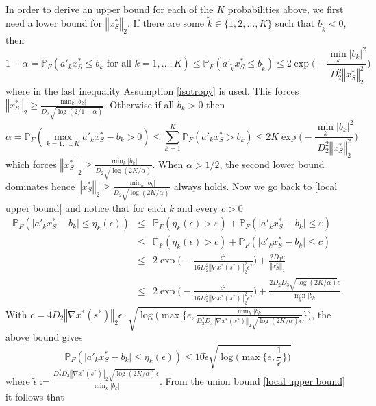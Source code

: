 \documentclass[mnsc,blindrev]{informs4} %
\newcommand{\norm}[1]{\left \Vert #1 \right\Vert}
\begin{document}
In order to derive an upper bound for each of the $K$ probabilities above, we first need a lower bound for $\norm{x^*_S}_2$. If there are some $\tilde k\in\{1,2,\ldots,K\}$ such that $b_{\tilde k}<0$, then
\begin{equation*}
    1-\alpha = \mathbb P_F(a'_kx^*_S\leq b_k\text{ for all }k=1,\ldots,K)\leq\mathbb P_F(a'_{\tilde k}x^*_S\leq b_{\tilde k})\leq 2\exp\big(-\frac{\min_k\lvert b_k\rvert^2}{D_2^2\norm{x^*_S}_2^2}\big)
\end{equation*}
where in the last inequality Assumption \ref{isotropy} is used. This forces $\norm{x^*_S}_2\geq \frac{\min_k\lvert b_k\rvert}{D_2\sqrt{\log(2/1-\alpha)}}$.
Otherwise if all $b_k>0$ then
\begin{equation*}
    \alpha = \mathbb P_F(\max_{k=1,\ldots,K}a'_kx^*_S- b_k>0)\leq \sum_{k=1}^K\mathbb P_F(a'_kx^*_S>b_k)\leq 2K\exp\big(-\frac{\min_k\lvert b_k\rvert^2}{D_2^2\norm{x^*_S}_2^2}\big)
\end{equation*}
which forces $\norm{x^*_S}_2\geq \frac{\min_k\lvert b_k\rvert}{D_2\sqrt{\log(2K/\alpha)}}$. When $\alpha >1/2$, the second lower bound dominates hence $\norm{x^*_S}_2\geq \frac{\min_k\lvert b_k\rvert}{D_2\sqrt{\log(2K/\alpha)}}$ always holds. Now we go back to \eqref{local upper bound} and notice that for each $k$ and every $c>0$
\begin{eqnarray*}
\mathbb P_F(\lvert a'_kx^*_S- b_k\rvert\leq \eta_k(\epsilon))&\leq&\mathbb P_F(\eta_k(\epsilon)>\varepsilon)+\mathbb P_F(\lvert a'_kx^*_S- b_k\rvert\leq \varepsilon)\\
&\leq& \mathbb P_F(\eta_k(\epsilon)>c)+\mathbb P_F(\lvert a'_kx^*_S- b_k\rvert\leq c)\\
&\leq& 2\exp\big( -\frac{c^2}{16D_2^2\norm{\nabla x^*(s^*)}_2^2\epsilon^2}\big)+\frac{2D_3c}{\norm{x^*_S}_2}\\
&\leq& 2\exp\big( -\frac{c^2}{16D_2^2\norm{\nabla x^*(s^*)}_2^2\epsilon^2}\big)+\frac{2D_2D_3\sqrt{\log(2K/\alpha)}c}{\min_k\lvert b_k\rvert}.
\end{eqnarray*}
With $c=4D_2\norm{\nabla x^*(s^*)}_2\epsilon\cdot \sqrt{\log\Big(\max\Big\{e,\frac{\min_k\lvert b_k\rvert}{D_2^2D_3\norm{\nabla x^*(s^*)}_2\sqrt{\log(2K/\alpha)}\epsilon}\Big\}\Big)}$, the above bound gives
\begin{equation*}
\mathbb P_F(\lvert a'_kx^*_S- b_k\rvert\leq \eta_k(\epsilon))\leq  10\tilde\epsilon\sqrt{\log\big(\max\{e,\frac{1}{\tilde \epsilon}\}\big)}
\end{equation*}
where $\tilde \epsilon:=\frac{D_2^2D_3\norm{\nabla x^*(s^*)}_2\sqrt{\log(2K/\alpha)}\epsilon}{\min_k\lvert b_k\rvert}$. From the union bound \eqref{local upper bound} it follows that
\end{document}
